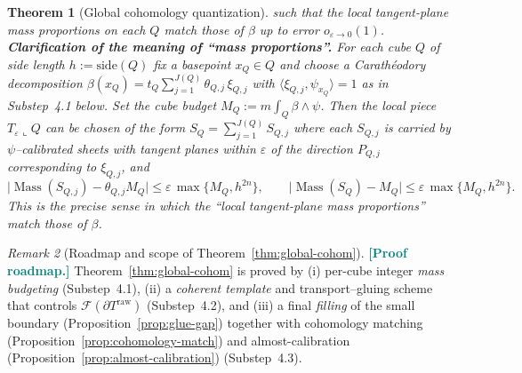 \documentclass[11pt]{article}
\newcommand{\REVMZ}[1]{\textcolor{teal}{#1}}  %
\numberwithin{equation}{section}  %
\theoremstyle{plain}
\newtheorem{theorem}{Theorem}[section]
\theoremstyle{definition}
\theoremstyle{remark}
\newtheorem{remark}[theorem]{Remark}
\DeclareMathOperator{\Mass}{Mass}
\begin{document}
\begin{theorem}[Global cohomology quantization]
such that the local tangent-plane mass proportions on each $Q$ match
those of $\beta$ up to error $o_{\varepsilon\to 0}(1)$.
{\noindent\textbf{Clarification of the meaning of ``mass proportions''.\label{rem:mass-proportions-meaning}}
For each cube $Q$ of side length $h:=\mathrm{side}(Q)$ fix a basepoint $x_Q\in Q$ and choose a Carath\'eodory decomposition
$\beta(x_Q)=t_Q\sum_{j=1}^{J(Q)}\theta_{Q,j}\,\xi_{Q,j}$ with $\langle \xi_{Q,j},\psi_{x_Q}\rangle=1$ as in Substep~4.1 below.
Set the \emph{cube budget}
$M_Q:=m\int_Q \beta\wedge\psi$.
Then the local piece $T_\varepsilon\llcorner Q$ can be chosen of the form
$S_Q=\sum_{j=1}^{J(Q)} S_{Q,j}$ where each $S_{Q,j}$ is carried by $\psi$--calibrated sheets
with tangent planes within $\varepsilon$ of the direction $P_{Q,j}$ corresponding to $\xi_{Q,j}$, and
\[
\bigl|\Mass(S_{Q,j})-\theta_{Q,j}M_Q\bigr|\le \varepsilon\,\max\{M_Q,h^{2n}\},
\qquad
\bigl|\Mass(S_Q)-M_Q\bigr|\le \varepsilon\,\max\{M_Q,h^{2n}\}.
\]
This is the precise sense in which the ``local tangent-plane mass proportions'' match those of $\beta$.}

\end{theorem}

\begin{remark}[Roadmap and scope of Theorem~\ref{thm:global-cohom}]\label{rem:global-cohom-commentary}
\REVMZ{\textbf{[Proof roadmap.]}}
Theorem~\ref{thm:global-cohom} is proved by (i) per-cube integer \emph{mass budgeting} (Substep~4.1), 
(ii) a \emph{coherent template} and transport--gluing scheme that controls $\mathcal F(\partial T^{\mathrm{raw}})$ (Substep~4.2), and 
(iii) a final \emph{filling} of the small boundary (Proposition~\ref{prop:glue-gap}) together with cohomology matching (Proposition~\ref{prop:cohomology-match}) and almost-calibration (Proposition~\ref{prop:almost-calibration}) (Substep~4.3).
\end{remark}
\end{document}
